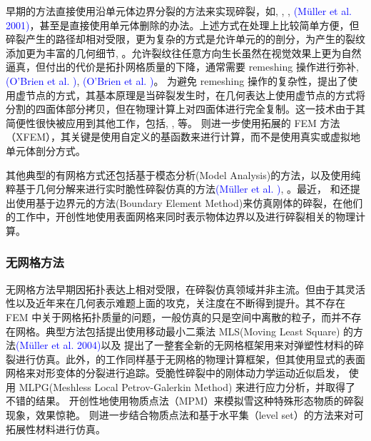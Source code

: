 早期的方法直接使用沿单元体边界分裂的方法来实现碎裂，如, , , \textcolor{blue}{(M\"{u}ller et al. 2001)\supercite{Muller2001}}，甚至是直接使用单元体删除的办法。上述方式在处理上比较简单方便，但碎裂产生的路径却相对受限，更为复杂的方式是允许单元的的剖分，为产生的裂纹添加更为丰富的几何细节, 。允许裂纹往任意方向生长虽然在视觉效果上更为自然逼真，但付出的代价是拓扑网格质量的下降，通常需要 remeshing 操作进行弥补, \textcolor{blue}{(O'Brien et al. )\supercite{OBrien1999}}, \textcolor{blue}{(O'Brien et al. )\supercite{OBrien2002}}。 为避免 remeshing 操作的复杂性，提出了使用虚节点的方式，其基本原理是当碎裂发生时，在几何表达上使用虚节点的方式将分割的四面体部分拷贝，但在物理计算上对四面体进行完全复制。这一技术由于其简便性很快被应用到其他工作，包括, , 等。 则进一步使用拓展的 FEM 方法（XFEM），其关键是使用自定义的基函数来进行计算，而不是使用真实或虚拟地单元体剖分方式。

其他典型的有网格方式还包括基于模态分析(Model Analysis)的方法，以及使用纯粹基于几何分解来进行实时脆性碎裂仿真的方法\textcolor{blue}{(M\"{u}ller et al. )\supercite{Muller2013}}, 。最近， 和还提出使用基于边界元的方法(Boundary Element Method)来仿真刚体的碎裂，在他们的工作中，开创性地使用表面网格来同时表示物体边界以及进行碎裂相关的物理计算。

\subsubsection{无网格方法}

无网格方法早期因拓扑表达上相对受限，在碎裂仿真领域并非主流。但由于其灵活性以及近年来在几何表示难题上面的攻克，关注度在不断得到提升。其不存在FEM 中关于网格拓扑质量的问题，一般仿真的只是空间中离散的粒子，而并不存在网格。典型方法包括提出使用移动最小二乘法 MLS(Moving Least Square) 的方法\textcolor{blue}{(M\"{u}ller et al. 2004)\supercite{Muller2004}}以及 提出了一整套全新的无网格框架用来对弹塑性材料的碎裂进行仿真。此外，的工作同样基于无网格的物理计算框架，但其使用显式的表面网格来对形变体的分裂进行追踪。受脆性碎裂中的刚体动力学运动近似启发，
使用 MLPG(Meshless Local Petrov-Galerkin Method) 来进行应力分析，并取得了不错的结果。
开创性地使用物质点法（MPM）来模拟雪这种特殊形态物质的碎裂现象，效果惊艳。
则进一步结合物质点法和基于水平集（level set）的方法来对可拓展性材料进行仿真。

